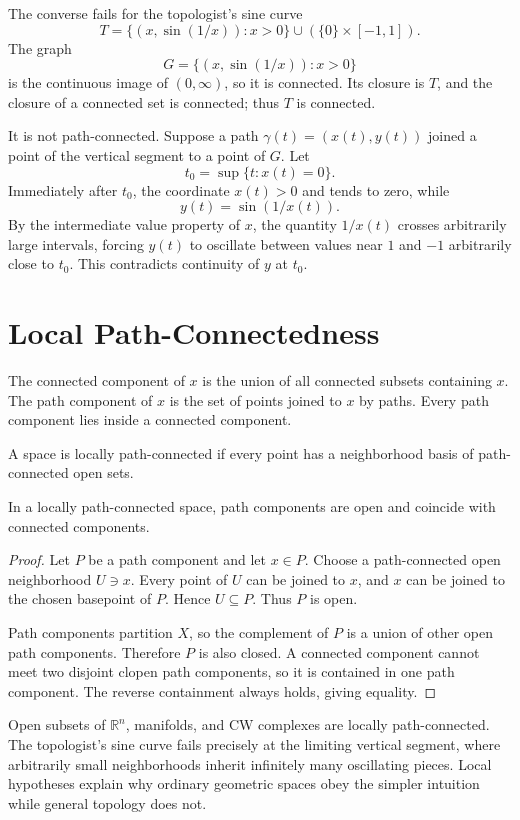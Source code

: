 The converse fails for the topologist's sine curve
\[
  T=
  \{(x,\sin(1/x)):x>0\}
  \cup
  (\{0\}\times[-1,1]).
\]
The graph
\[
  G=\{(x,\sin(1/x)):x>0\}
\]
is the continuous image of \((0,\infty)\), so it is connected.  Its closure is \(T\), and the closure of a connected set is connected; thus \(T\) is connected.

It is not path-connected.  Suppose a path \(\gamma(t)=(x(t),y(t))\) joined a point of the vertical segment to a point of \(G\).  Let
\[
  t_0=\sup\{t:x(t)=0\}.
\]
Immediately after \(t_0\), the coordinate \(x(t)>0\) and tends to zero, while
\[
  y(t)=\sin(1/x(t)).
\]
By the intermediate value property of \(x\), the quantity \(1/x(t)\) crosses arbitrarily large intervals, forcing \(y(t)\) to oscillate between values near \(1\) and \(-1\) arbitrarily close to \(t_0\).  This contradicts continuity of \(y\) at \(t_0\).

\section{Local Path-Connectedness}

The connected component of \(x\) is the union of all connected subsets containing \(x\).  The path component of \(x\) is the set of points joined to \(x\) by paths.  Every path component lies inside a connected component.

A space is locally path-connected if every point has a neighborhood basis of path-connected open sets.

\begin{theorem}
In a locally path-connected space, path components are open and coincide with connected components.
\end{theorem}

\begin{proof}
Let \(P\) be a path component and let \(x\in P\).  Choose a path-connected open neighborhood \(U\ni x\).  Every point of \(U\) can be joined to \(x\), and \(x\) can be joined to the chosen basepoint of \(P\).  Hence \(U\subseteq P\).  Thus \(P\) is open.

Path components partition \(X\), so the complement of \(P\) is a union of other open path components.  Therefore \(P\) is also closed.  A connected component cannot meet two disjoint clopen path components, so it is contained in one path component.  The reverse containment always holds, giving equality.
\end{proof}

Open subsets of \(\mathbb R^n\), manifolds, and CW complexes are locally path-connected.  The topologist's sine curve fails precisely at the limiting vertical segment, where arbitrarily small neighborhoods inherit infinitely many oscillating pieces.  Local hypotheses explain why ordinary geometric spaces obey the simpler intuition while general topology does not.
